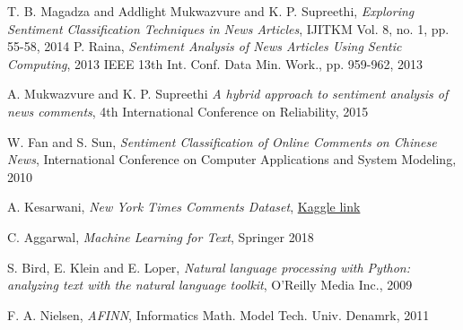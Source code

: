 \begin{thebibliography}{15}

\vspace{1cm}

T. B. Magadza and Addlight Mukwazvure and K. P. Supreethi,
  \textit{Exploring Sentiment Classification Techniques in News Articles}, IJITKM Vol. 8, no. 1, pp. 55-58, 2014
P. Raina, \textit{Sentiment Analysis of News Articles Using Sentic Computing}, 2013 IEEE 13th Int. Conf. Data Min. Work., pp. 959-962, 2013

A. Mukwazvure and K. P. Supreethi \textit{A hybrid approach to sentiment analysis of news comments}, 4th International Conference on Reliability, 2015

W. Fan and S. Sun, \textit{Sentiment Classification of Online Comments on Chinese News}, International Conference on Computer Applications and System Modeling, 2010

A. Kesarwani, \textit{New York Times Comments Dataset}, \href{https://www.kaggle.com/aashita/nyt-comments}{Kaggle link}

C. Aggarwal, \textit{Machine Learning for Text}, Springer 2018

S. Bird, E. Klein and E. Loper, \textit{Natural language processing with Python: analyzing text with the natural language toolkit}, O'Reilly Media Inc., 2009

F. A. Nielsen, \textit{AFINN}, Informatics Math. Model Tech. Univ. Denamrk, 2011


\end{thebibliography}